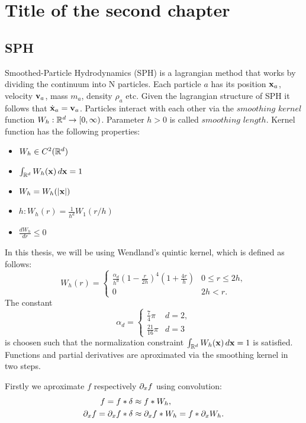 \chapter{Title of the second chapter}

\section{SPH}
Smoothed-Particle Hydrodynamics (SPH) is a lagrangian method that works by dividing the continuum into N particles. 
Each particle $a$ has its position $\mathbf{x}_a$, velocity $\mathbf{v}_a$, mass $m_a$, density $\rho_a$ etc. Given the lagrangian
structure of SPH it follows that $\dot{\mathbf{x}}_a = \mathbf{v}_a$.
Particles interact with each other via the $ smoothing$ $kernel$ function $W_h : \mathbb{R}^d \rightarrow [0, \infty)$. Parameter $h > 0$ is called
$smoothing$ $length$. Kernel function has the following properties:
\begin{itemize}
    \item $W_h \in C^2(\mathbb{R}^d)$
    \item $\int_{\mathbb{R}^d} W_h(\mathbf{x}) \,d\mathbf{x} = 1$
    \item $W_h = W_h(|\mathbf{x}|)$
    \item $h: W_h(r) = \frac{1}{h^d}W_1(r/h)$
    \item $\frac{dW_h}{dr} \leq 0$
\end{itemize}
In this thesis, we will be using Wendland's quintic kernel, which is defined as follows:
\begin{equation}
    W_h(r) =
    \begin{cases}
        \frac{\alpha_d}{h^d} (1 - \frac{r}{2h})^4(1 + \frac{4r}{h})
        & 0 \leq r \leq 2h,\\
        0
        & 2h < r.
    \end{cases} 
\end{equation}
The constant 
\begin{equation}
    \alpha_d =
    \begin{cases}
        \frac{7}{4}\pi &d = 2,\\
        \frac{21}{16}\pi &d = 3
    \end{cases}
\end{equation}
is choosen such that the normalization constraint $\int_{\mathbb{R}^d} W_h(\mathbf{x}) \,d\mathbf{x} = 1$ is satisfied.
Functions and partial derivatives are aproximated via the smoothing kernel in two steps. 

Firstly we aproximate $f$ 
respectively ${\partial}_x f$ using convolution:
\begin{equation}
    \begin{aligned}
            f = f * \delta &\approx f * W_h, \\
            {\partial}_x f = {\partial}_x f * \delta &\approx {\partial}_x f * W_h = f * {\partial}_x W_h.    
    \end{aligned}
\end{equation}


